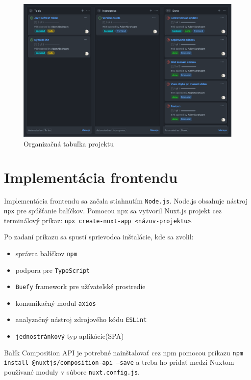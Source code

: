     \begin{figure}[!hbt]
        \centering
        \includegraphics[scale=0.3]{obrazky/board.png}
        \caption{Organizačná tabuľka projektu}
        \label{pic:board}
    \end{figure}

\section{Implementácia frontendu}
\label{impfrontend}
Implementácia frontendu sa začala stiahnutím \texttt{Node.js}. Node.js obsahuje nástroj \texttt{npx} pre spúšťanie balíčkov. Pomocou npx sa vytvoril Nuxt.js projekt cez terminálový príkaz: \texttt{npx create-nuxt-app <názov-projektu>}. 

\vspace{5mm}
Po zadaní príkazu sa spustí sprievodca inštalácie, kde sa zvolil:
    \begin{itemize}
        \item správca balíčkov \texttt{npm}
        \item podpora pre \texttt{TypeScript}
        \item \texttt{Buefy} framework pre užívateľské prostredie
        \item komunikačný modul \texttt{axios}
        \item analyzačný nástroj zdrojového kódu \texttt{ESLint} 
        \item \texttt{jednostránkový} typ aplikácie(SPA)
    \end{itemize}
    
\vspace{5mm}
Balík Composition API je potrebné nainštalovať cez npm pomocou príkazu \texttt{npm install @nuxtjs/composition-api --save} a treba ho pridať medzi Nuxtom používané moduly v súbore \texttt{nuxt.config.js}.

